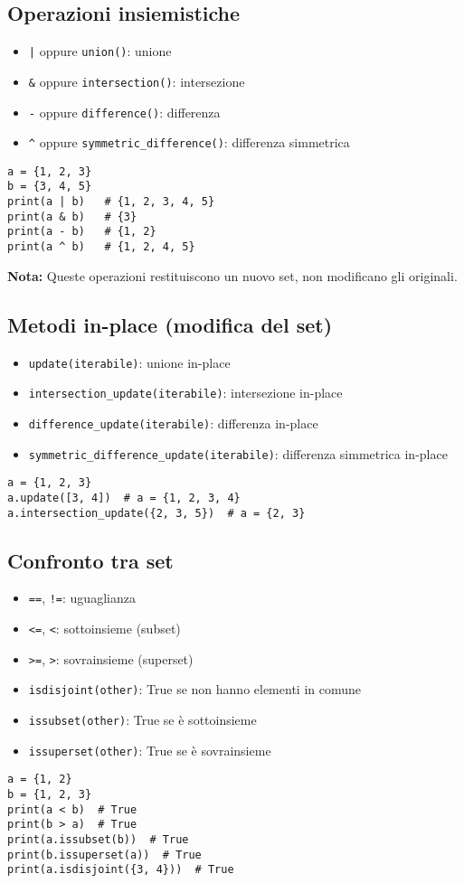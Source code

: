 \documentclass[a4paper,12pt]{article}
\begin{document}
\subsection*{Operazioni insiemistiche}
\begin{itemize}
    \item \texttt{|} oppure \texttt{union()}: unione
    \item \texttt{\&} oppure \texttt{intersection()}: intersezione
    \item \texttt{-} oppure \texttt{difference()}: differenza
    \item \texttt{\^} oppure \texttt{symmetric\_difference()}: differenza simmetrica
\end{itemize}
\begin{lstlisting}
a = {1, 2, 3}
b = {3, 4, 5}
print(a | b)   # {1, 2, 3, 4, 5}
print(a & b)   # {3}
print(a - b)   # {1, 2}
print(a ^ b)   # {1, 2, 4, 5}
\end{lstlisting}
\textbf{Nota:} Queste operazioni restituiscono un nuovo set, non modificano gli originali.

\subsection*{Metodi in-place (modifica del set)}
\begin{itemize}
    \item \texttt{update(iterabile)}: unione in-place
    \item \texttt{intersection\_update(iterabile)}: intersezione in-place
    \item \texttt{difference\_update(iterabile)}: differenza in-place
    \item \texttt{symmetric\_difference\_update(iterabile)}: differenza simmetrica in-place
\end{itemize}
\begin{lstlisting}
a = {1, 2, 3}
a.update([3, 4])  # a = {1, 2, 3, 4}
a.intersection_update({2, 3, 5})  # a = {2, 3}
\end{lstlisting}

\subsection*{Confronto tra set}
\begin{itemize}
    \item \texttt{==}, \texttt{!=}: uguaglianza
    \item \texttt{<=}, \texttt{<}: sottoinsieme (subset)
    \item \texttt{>=}, \texttt{>}: sovrainsieme (superset)
    \item \texttt{isdisjoint(other)}: True se non hanno elementi in comune
    \item \texttt{issubset(other)}: True se è sottoinsieme
    \item \texttt{issuperset(other)}: True se è sovrainsieme
\end{itemize}
\begin{lstlisting}
a = {1, 2}
b = {1, 2, 3}
print(a < b)  # True
print(b > a)  # True
print(a.issubset(b))  # True
print(b.issuperset(a))  # True
print(a.isdisjoint({3, 4}))  # True
\end{lstlisting}
\end{document}
